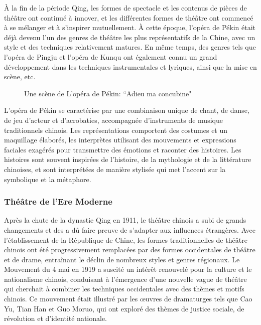 \documentclass[UTF8,a4paper,12pt]{ctexart}
\numberwithin{equation}{section}
\begin{document}
À la fin de la période Qing, les formes de spectacle et les contenus de pièces de théâtre ont continué à innover, et les différentes formes de théâtre ont commencé à se mélanger et à s'inspirer mutuellement. À cette époque, l'opéra de Pékin était déjà devenu l'un des genres de théâtre les plus représentatifs de la Chine, avec un style et des techniques relativement matures. En même temps, des genres tels que l'opéra de Pingju et l'opéra de Kunqu ont également connu un grand développement dans les techniques instrumentales et lyriques, ainsi que la mise en scène, etc.
\begin{figure}[H] 
\caption{Une scène de L'opéra de Pékin: ``Adieu ma concubine"}
\end{figure}
L'opéra de Pékin se caractérise par une combinaison unique de chant, de danse, de jeu d'acteur et d'acrobaties, accompagnée d'instruments de musique traditionnels chinois. Les représentations comportent des costumes et un maquillage élaborés, les interprètes utilisant des mouvements et expressions faciales exagérés pour transmettre des émotions et raconter des histoires. Les histoires sont souvent inspirées de l'histoire, de la mythologie et de la littérature chinoises, et sont interprétées de manière stylisée qui met l'accent sur la symbolique et la métaphore.

\subsubsection{Théâtre de l'Ere Moderne}
Après la chute de la dynastie Qing en 1911, le théâtre chinois a subi de grands changements et des a dû faire preuve de s'adapter aux influences étrangères. Avec l'établissement de la République de Chine, les formes traditionnelles de théâtre chinois ont été progressivement remplacées par des formes occidentales de théâtre et de drame, entraînant le déclin de nombreux styles et genres régionaux. Le Mouvement du 4 mai en 1919 a suscité un intérêt renouvelé pour la culture et le nationalisme chinois, conduisant à l'émergence d'une nouvelle vague de théâtre qui cherchait à combiner les techniques occidentales avec des thèmes et motifs chinois. Ce mouvement était illustré par les œuvres de dramaturges tels que Cao Yu, Tian Han et Guo Moruo, qui ont exploré des thèmes de justice sociale, de révolution et d'identité nationale.
\end{document}
